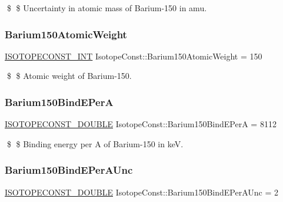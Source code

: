 \$ \$ Uncertainty in atomic mass of Barium-\/150 in amu. \mbox{\label{group___isotope_const-_barium-_ba150_ga35b9da9bd2f16b9ec3f08a672fe87e9c}} 
\subsubsection{\texorpdfstring{Barium150\+Atomic\+Weight}{Barium150AtomicWeight}}
{\footnotesize\ttfamily \mbox{\hyperlink{group___isotope_const-_macros_ga5f18360b3e99483a35c32d789e62621c}{I\+S\+O\+T\+O\+P\+E\+C\+O\+N\+S\+T\+\_\+\+I\+NT}} Isotope\+Const\+::\+Barium150\+Atomic\+Weight = 150}

\$ \$ Atomic weight of Barium-\/150. \mbox{\label{group___isotope_const-_barium-_ba150_gaaaba44210d66da014600a0690a7d495d}} 
\subsubsection{\texorpdfstring{Barium150\+Bind\+E\+PerA}{Barium150BindEPerA}}
{\footnotesize\ttfamily \mbox{\hyperlink{group___isotope_const-_macros_ga8f45a7272ce02c0b4c65c44636ed719a}{I\+S\+O\+T\+O\+P\+E\+C\+O\+N\+S\+T\+\_\+\+D\+O\+U\+B\+LE}} Isotope\+Const\+::\+Barium150\+Bind\+E\+PerA = 8112}

\$ \$ Binding energy per A of Barium-\/150 in keV. \mbox{\label{group___isotope_const-_barium-_ba150_ga5483f3eb5f49ed31b19260ad7c4a4d28}} 
\subsubsection{\texorpdfstring{Barium150\+Bind\+E\+Per\+A\+Unc}{Barium150BindEPerAUnc}}
{\footnotesize\ttfamily \mbox{\hyperlink{group___isotope_const-_macros_ga8f45a7272ce02c0b4c65c44636ed719a}{I\+S\+O\+T\+O\+P\+E\+C\+O\+N\+S\+T\+\_\+\+D\+O\+U\+B\+LE}} Isotope\+Const\+::\+Barium150\+Bind\+E\+Per\+A\+Unc = 2}

